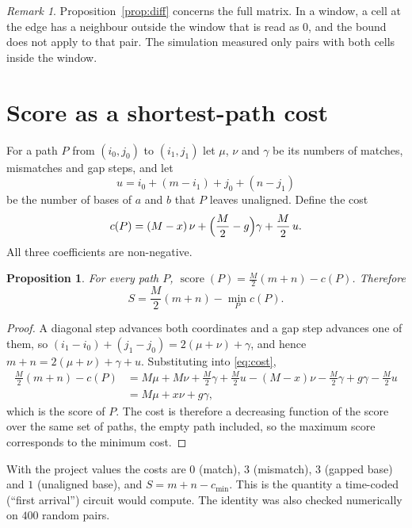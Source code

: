\documentclass[11pt]{article}
\theoremstyle{plain}
\newtheorem{proposition}[theorem]{Proposition}
\theoremstyle{definition}
\theoremstyle{remark}
\newtheorem*{remark}{Remark}
\DeclareMathOperator{\score}{score}
\begin{document}
\begin{remark}
Proposition~\ref{prop:diff} concerns the full matrix. In a window, a cell at the
edge has a neighbour outside the window that is read as $0$, and the bound does
not apply to that pair. The simulation measured only pairs with both cells
inside the window.
\end{remark}

\section{Score as a shortest-path cost}

For a path $P$ from $(i_0,j_0)$ to $(i_1,j_1)$ let $\mu$, $\nu$ and $\gamma$ be
its numbers of matches, mismatches and gap steps, and let
\[
u = i_0 + (m - i_1) + j_0 + (n - j_1)
\]
be the number of bases of $a$ and $b$ that $P$ leaves unaligned. Define the cost
\begin{equation}\label{eq:cost}
c(P) = (M - x)\,\nu + \Bigl(\frac{M}{2} - g\Bigr)\gamma + \frac{M}{2}\,u .
\end{equation}
All three coefficients are non-negative.

\begin{proposition}\label{prop:cost}
For every path $P$, $\score(P) = \frac{M}{2}(m+n) - c(P)$. Therefore
\[
S = \frac{M}{2}(m+n) - \min_{P} c(P).
\]
\end{proposition}

\begin{proof}
A diagonal step advances both coordinates and a gap step advances one of them,
so $(i_1 - i_0) + (j_1 - j_0) = 2(\mu + \nu) + \gamma$, and hence
$m + n = 2(\mu + \nu) + \gamma + u$. Substituting into \eqref{eq:cost},
\begin{align*}
\frac{M}{2}(m+n) - c(P)
 &= M\mu + M\nu + \frac{M}{2}\gamma + \frac{M}{2}u
    - (M - x)\nu - \frac{M}{2}\gamma + g\gamma - \frac{M}{2}u \\
 &= M\mu + x\nu + g\gamma ,
\end{align*}
which is the score of $P$. The cost is therefore a decreasing function of the
score over the same set of paths, the empty path included, so the maximum score
corresponds to the minimum cost.
\end{proof}

With the project values the costs are $0$ (match), $3$ (mismatch), $3$ (gapped
base) and $1$ (unaligned base), and $S = m + n - c_{\min}$. This is the quantity
a time-coded (``first arrival'') circuit would compute. The identity was also
checked numerically on $400$ random pairs.
\end{document}
